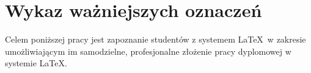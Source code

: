 \chapter{Wykaz ważniejszych oznaczeń}
\label{sec:wykazOznaczen}


Celem poniższej pracy jest zapoznanie studentów z systemem \LaTeX~w zakresie umożliwiającym im samodzielne, profesjonalne złożenie pracy dyplomowej w systemie \LaTeX.


















